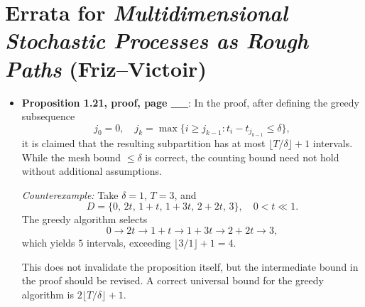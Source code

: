 \documentclass[12pt]{article}
\begin{document}
\section*{Errata for \emph{Multidimensional Stochastic Processes as Rough Paths} (Friz–Victoir)}

\begin{itemize}

\item \textbf{Proposition 1.21, proof, page \_\_}:  
In the proof, after defining the greedy subsequence
\[
j_0 = 0, \quad j_k = \max\{ i \ge j_{k-1} : t_i - t_{j_{k-1}} \le \delta \},
\]
it is claimed that the resulting subpartition has at most $\lfloor T/\delta \rfloor + 1$ intervals.
While the mesh bound $\le \delta$ is correct, the counting bound need not hold without additional assumptions.

\emph{Counterexample:}  
Take $\delta = 1$, $T = 3$, and
\[
D = \{ 0,\, 2t,\, 1+t,\, 1+3t,\, 2+2t,\, 3 \}, \quad 0 < t \ll 1.
\]
The greedy algorithm selects
\[
0 \to 2t \to 1+t \to 1+3t \to 2+2t \to 3,
\]
which yields $5$ intervals, exceeding $\lfloor 3/1 \rfloor + 1 = 4$.

This does not invalidate the proposition itself, but the intermediate bound in the proof should be revised.
A correct universal bound for the greedy algorithm is $2\lfloor T/\delta \rfloor + 1$.

\end{itemize}
\end{document}
